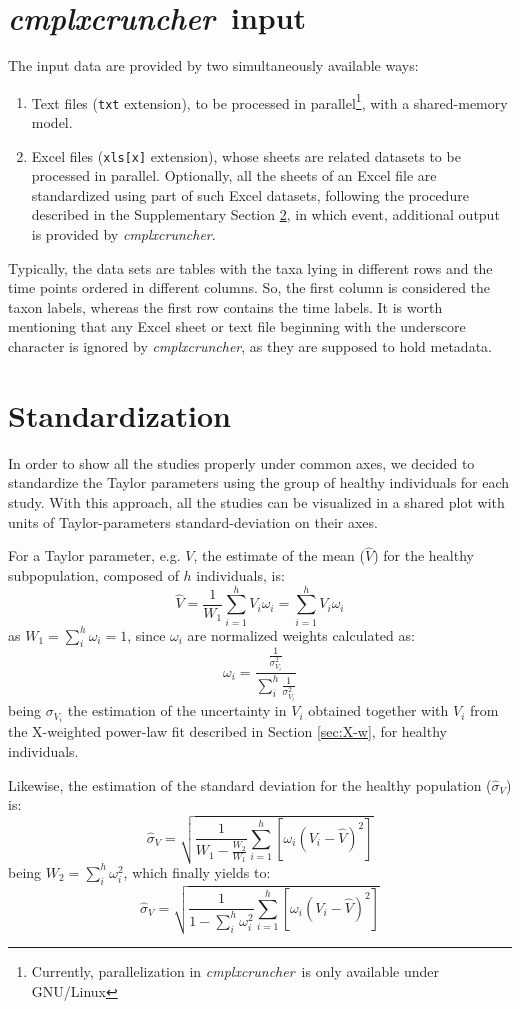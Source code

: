 \documentclass[12pt]{article}
\newcommand{\CC}[0]{\emph{cmplxcruncher}}
\begin{document}
\section{\CC\ input}
The input data are provided by two simultaneously available ways:
\begin{enumerate}
	\item Text files (\texttt{txt} extension), to be processed in parallel\footnote{Currently, parallelization in \CC\ is only available under GNU/Linux}, with a shared-memory model.
	\item Excel files (\texttt{xls[x]} extension), whose sheets are related datasets to be processed in parallel\footnotemark[\value{footnote}]. Optionally, all the sheets of an Excel file are standardized using part of such Excel datasets, following the procedure described in the Supplementary Section \ref{sec:stan}, in which event, additional output is provided by \CC.
\end{enumerate}
Typically, the data sets are tables with the taxa lying in different rows and the time points ordered in different columns. So, the first column is considered the taxon labels, whereas the first row contains the time labels. It is worth mentioning that any Excel sheet or text file beginning with the underscore character is ignored by \CC, as they are supposed to hold metadata.

\section{Standardization} \label{sec:stan}
In order to show all the studies properly under common axes, we decided to standardize the Taylor parameters using the group of healthy individuals for each study. With this approach, all the studies can be visualized in a shared plot with units of Taylor-parameters standard-deviation on their axes.

For a Taylor parameter, e.g. $V$, the estimate of the mean ($\widehat{V}$) for the healthy subpopulation, composed of $h$ individuals, is:
$$\widehat{V} = \frac{1}{W_1}\sum_{i=1}^h V_i \omega_i=\sum_{i=1}^h V_i \omega_i$$
as $W_1=\sum_i^h \omega_i=1$, since $\omega_i$ are normalized weights calculated as:
$$\omega_i = \frac{\frac{1}{\sigma^2_{V_i}}}{\sum_i^h\frac{1}{\sigma^2_{V_i}}}$$
being $\sigma_{V_i}$ the estimation of the uncertainty in $V_i$ obtained together with $V_i$ from the X-weighted power-law fit described in Section \ref{sec:X-w}, for healthy individuals.

Likewise, the estimation of the standard deviation for the healthy population ($\widehat{\sigma}_V$) is:
$$\widehat{\sigma}_V = \sqrt{\frac{1}{W_1-\frac{W_2}{W_1}}\sum_{i=1}^h\left[\omega_i\left(V_i-\hat{V}\right)^2\right]}$$
being $W_2=\sum_i^h \omega_i^2$, which finally yields to:
$$\widehat{\sigma}_V = \sqrt{\frac{1}{1-\sum_i^h \omega_i^2}\sum_{i=1}^h\left[\omega_i\left(V_i-\hat{V}\right)^2\right]}$$
\end{document}

